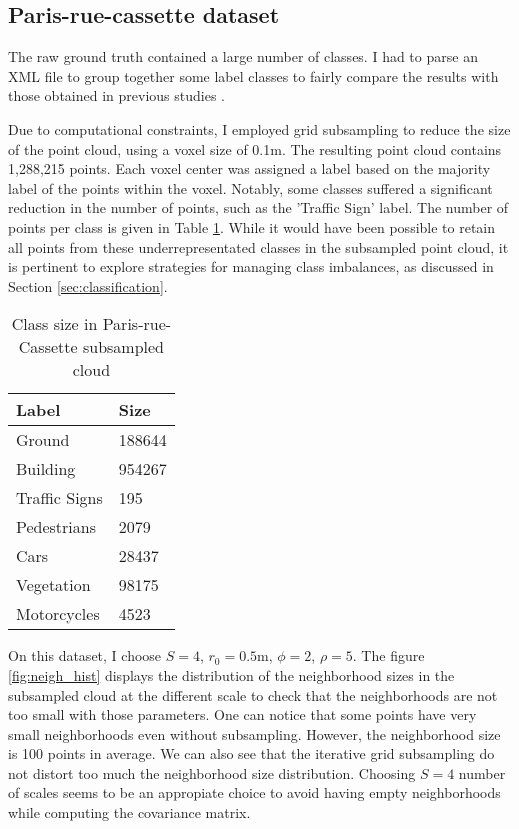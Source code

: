 \documentclass{article}
\begin{document}
\subsection{Paris-rue-cassette dataset}
The raw ground truth contained a large number of classes. I had to parse an XML file to group together some label classes to fairly compare the results with those obtained in previous studies \cite{thomas_semantic_2018,hackel_fast_nodate,weinmann_semantic_2015}. 

Due to computational constraints, I employed grid subsampling to reduce the size of the point cloud, using a voxel size of 0.1m. The resulting point cloud contains 1,288,215 points. Each voxel center was assigned a label based on the majority label of the points within the voxel. Notably, some classes suffered a significant reduction in the number of points, such as the 'Traffic Sign' label. The number of points per class is given in Table \ref{tab:cassette_label_size}. While it would have been possible to retain all points from these underrepresentated classes in the subsampled point cloud, it is pertinent to explore strategies for managing class imbalances, as discussed in Section \ref{sec:classification}.

\begin{table}[H]
    \begin{center}
            \begin{tabular}{ll}
                    Label & Size \\
                    \hline
                    Ground & 188644 \\
                    Building & 954267 \\
                    Traffic Signs & 195 \\
                    Pedestrians & 2079 \\
                    Cars & 28437 \\
                    Vegetation & 98175 \\
                    Motorcycles & 4523 \\
            \end{tabular}
    \end{center}
    \caption{Class size in Paris-rue-Cassette subsampled cloud}
    \label{tab:cassette_label_size}
\end{table}

On this dataset, I choose $S=4$, $r_0=0.5$m, $\phi=2$, $\rho=5$. The figure \ref{fig:neigh_hist} displays the distribution of the neighborhood sizes in the subsampled cloud at the different scale to check that the neighborhoods are not too small with those parameters. One can notice that some points have very small neighborhoods even without subsampling. However, the neighborhood size is 100 points in average. We can also see that the iterative grid subsampling do not distort too much the neighborhood size distribution. Choosing $S=4$ number of scales seems to be an appropiate choice to avoid having empty neighborhoods while computing the covariance matrix. 
\end{document}
